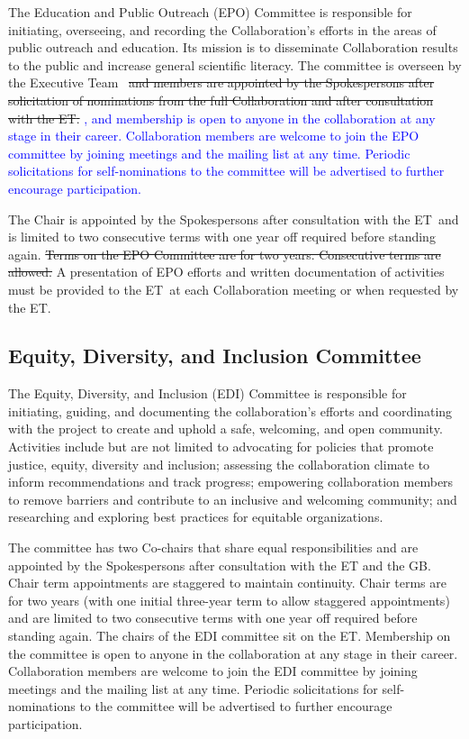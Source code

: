 \documentclass[12pt]{article}
\newcommand{\exec}{{Executive Team}}
\newcommand{\shorte}{{ET}}  %
\begin{document}
The Education and Public Outreach (EPO) Committee is responsible for initiating, overseeing, and recording the Collaboration's efforts in the areas of public outreach and education. Its mission is to disseminate Collaboration results to the public and increase general scientific literacy. The committee is overseen by the \exec \ \st{ and members are appointed by the Spokespersons after solicitation of nominations from the full Collaboration and after consultation with the \shorte.} \textcolor{blue}{, and membership is open to anyone in the collaboration at any stage in their career. Collaboration members are welcome to join the EPO committee by joining meetings and the mailing list at any time. Periodic solicitations for self-nominations to the committee will be advertised to further encourage participation.}

The Chair is appointed by the Spokespersons after consultation with the \shorte\  and is limited to two consecutive terms with one year off required before standing again. \st{Terms on the EPO Committee are for two years. Consecutive terms are allowed.}  A presentation of EPO efforts and written documentation of activities must be provided to the \shorte\ at each Collaboration meeting or when requested by the \shorte.

\subsection{Equity, Diversity, and Inclusion Committee}
The Equity, Diversity, and Inclusion (EDI) Committee is responsible for initiating, guiding, and documenting the collaboration's efforts and coordinating with the project to create and uphold a safe, welcoming, and open community. Activities include but are not limited to advocating for policies that promote justice, equity, diversity and inclusion; assessing the collaboration climate to inform recommendations and track progress; empowering collaboration members to remove barriers and contribute to an inclusive and welcoming community; and researching and exploring best practices for equitable organizations.

The committee has two Co-chairs that share equal responsibilities and are appointed by the Spokespersons after consultation with the ET and the GB. Chair term appointments are staggered to maintain continuity. Chair terms are for two years (with one initial three-year term to allow staggered appointments) and are limited to two consecutive terms with one year off required before standing again. The chairs of the EDI committee sit on the ET. Membership on the committee is open to anyone in the collaboration at any stage in their career. Collaboration members are welcome to join the EDI committee by joining meetings and the mailing list at any time. Periodic solicitations for self-nominations to the committee will be advertised to further encourage participation.
\end{document}
